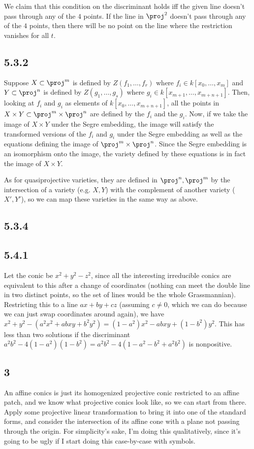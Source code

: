 \documentclass{article}
\begin{document}
We claim that this condition on the discriminant holds iff the given line doesn't pass through any of the $4$ points. If the line in $\proj^2$ doesn't pass through any of the $4$ points, then there will be no point on the line where the restriction vanishes for all $t$. 
\subsection*{5.3.2}
Suppose $X\subset \proj^m$ is defined by $Z(f_1,\ldots,f_r)$ where $f_i\in k[x_0,\ldots,x_m]$ and $Y\subset \proj^n$ is defined by $Z(g_1,\ldots,g_s)$ where $g_i\in k[x_{m+1},\ldots,x_{m+n+1}]$. Then, looking at $f_i$ and $g_i$ as elements of $k[x_0,\ldots,x_{m+n+1}]$, all the points in $X\times Y\subset \proj^m\times\proj^n$ are defined by the $f_i$ and the $g_i$. Now, if we take the image of $X\times Y$ under the Segre embedding, the image will satisfy the transformed versions of the $f_i$ and $g_i$ under the Segre embedding as well as the equations defining the image of $\proj^m\times\proj^n$. Since the Segre embedding is an isomorphism onto the image, the variety defined by these equations is in fact the image of $X\times Y$.

As for quasiprojective varieties, they are defined in $\proj^n,\proj^m$ by the intersection of a variety (e.g. $X,Y$) with the complement of another variety ($X',Y'$), so we can map these varieties in the same way as above.
\subsection*{5.3.4}
\subsection*{5.4.1}
Let the conic be $x^2+y^2-z^2$, since all the interesting irreducible conics are equivalent to this after a change of coordinates (nothing can meet the double line in two distinct points, so the set of lines would be the whole Grassmannian). Restricting this to a line $ax+by+cz$ (assuming $c\neq0$, which we can do because we can just swap coordinates around again), we have $x^2+y^2-(a^2x^2+abxy+b^2y^2)=(1-a^2)x^2-abxy+(1-b^2)y^2$. This has less than two solutions if the discriminant $a^2b^2-4(1-a^2)(1-b^2)=a^2b^2-4(1-a^2-b^2+a^2b^2)$ is nonpositive. 
\subsection*{3}
An affine conics is just its homogenized projective conic restricted to an affine patch, and we know what projective conics look like, so we can start from there. Apply some projective linear transformation to bring it into one of the standard forms, and consider the intersection of its affine cone with a plane not passing through the origin. For simplicity's sake, I'm doing this qualitatively, since it's going to be ugly if I start doing this case-by-case with symbols.
\end{document}
